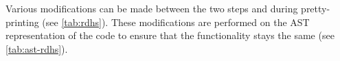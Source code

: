 \documentclass[%
class=scrreprt,
chapterprefix=false,%
open=right,%
twoside=false,%
paper=a4,%
logofile={Logo\_zentral\_farbig\_EN.png},%
thesistype=master,%
UKenglish,%
]{se2thesis}
\theoremstyle{definition}
\begin{document}
	
	Various modifications can be made between the two steps and during pretty-printing (see \autoref{tab:rdhs}).
	These modifications are performed on the AST representation of the code to ensure that the functionality stays the same (see \autoref{tab:ast-rdhs}).
	
	
\end{document}
